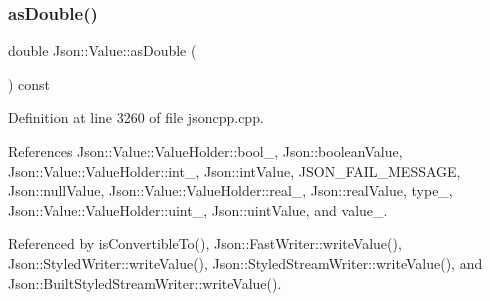 \subsubsection{\texorpdfstring{as\+Double()}{asDouble()}}
{\footnotesize\ttfamily double Json\+::\+Value\+::as\+Double (\begin{DoxyParamCaption}{ }\end{DoxyParamCaption}) const}



Definition at line 3260 of file jsoncpp.\+cpp.



References Json\+::\+Value\+::\+Value\+Holder\+::bool\+\_\+, Json\+::boolean\+Value, Json\+::\+Value\+::\+Value\+Holder\+::int\+\_\+, Json\+::int\+Value, J\+S\+O\+N\+\_\+\+F\+A\+I\+L\+\_\+\+M\+E\+S\+S\+A\+GE, Json\+::null\+Value, Json\+::\+Value\+::\+Value\+Holder\+::real\+\_\+, Json\+::real\+Value, type\+\_\+, Json\+::\+Value\+::\+Value\+Holder\+::uint\+\_\+, Json\+::uint\+Value, and value\+\_\+.



Referenced by is\+Convertible\+To(), Json\+::\+Fast\+Writer\+::write\+Value(), Json\+::\+Styled\+Writer\+::write\+Value(), Json\+::\+Styled\+Stream\+Writer\+::write\+Value(), and Json\+::\+Built\+Styled\+Stream\+Writer\+::write\+Value().


